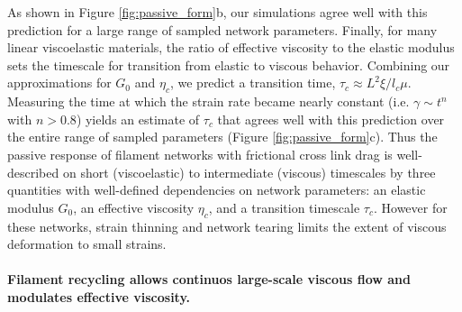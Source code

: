 \documentclass[10pt,letterpaper]{article}
\begin{document}
As shown in Figure \ref{fig:passive_form}b, our simulations agree well with this prediction for a large range of sampled network parameters. Finally, for many linear viscoelastic materials, the ratio of effective viscosity to the elastic modulus sets the timescale for transition from elastic to viscous behavior\cite{mccrum1997principles}. Combining our approximations for $G_0$ and $\eta_c$, we predict a transition time, $\tau_c \approx L^2\xi/l_c\mu$. Measuring the time at which the strain rate became nearly constant (i.e. $\gamma \sim t^n$ with $n>0.8$) yields an estimate of $\tau_c$ that agrees well with this prediction over the entire range of sampled parameters (Figure \ref{fig:passive_form}c).  Thus the passive response of filament networks with frictional cross link drag is well-described on short (viscoelastic) to intermediate (viscous) timescales by three quantities with well-defined dependencies on network parameters: an elastic modulus $G_0$, an effective viscosity $\eta_c$, and a transition timescale $\tau_c$. However for these networks, strain thinning and network tearing limits the extent of viscous deformation to small strains.

\paragraph{Filament recycling allows continuos large-scale viscous flow and modulates effective viscosity.} 
 
\end{document}
